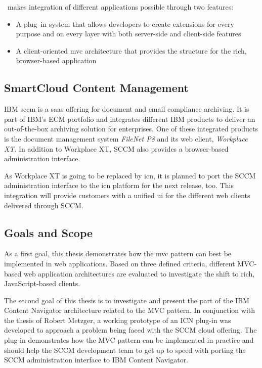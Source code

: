 \nexus\ makes integration of different applications possible through two features:
\begin{itemize}
	\item A plug--in system that allows developers to create extensions for every purpose and on every layer with both server-side and client-side features
	\item A client-oriented \ac{mvc} architecture that provides the structure for the rich, browser-based application
\end{itemize}

\subsection*{SmartCloud Content Management}
IBM \ac{sccm} is a \ac{saas} offering for document and email compliance archiving. It is part of IBM's ECM portfolio and integrates different IBM products to deliver an out-of-the-box archiving solution for enterprises. One of these integrated products is the document management system \emph{FileNet P8} and its web client, \emph{Workplace XT}. In addition to Workplace XT, SCCM also provides a browser-based administration interface.

As Workplace XT is going to be replaced by \ac{icn}, it is planned to port the SCCM administration interface to the \ac{icn} platform for the next release, too. This integration will provide customers with a unified \acl{ui} for the different web clients delivered through SCCM.

\subsection*{Goals and Scope}
As a first goal, this thesis demonstrates how the \ac{mvc} pattern can best be implemented in web applications. Based on three defined criteria, different MVC-based web application architectures are evaluated to investigate the shift to rich, JavaScript-based clients.

The second goal of this thesis is to investigate and present the part of the IBM Content Navigator architecture related to the MVC pattern. In conjunction with the thesis of Robert Metzger, a working prototype of an ICN plug-in was developed to approach a problem being faced with the SCCM cloud offering. The plug-in demonstrates how the MVC pattern can be implemented in practice and should help the SCCM development team to get up to speed with porting the SCCM administration interface to IBM Content Navigator.

